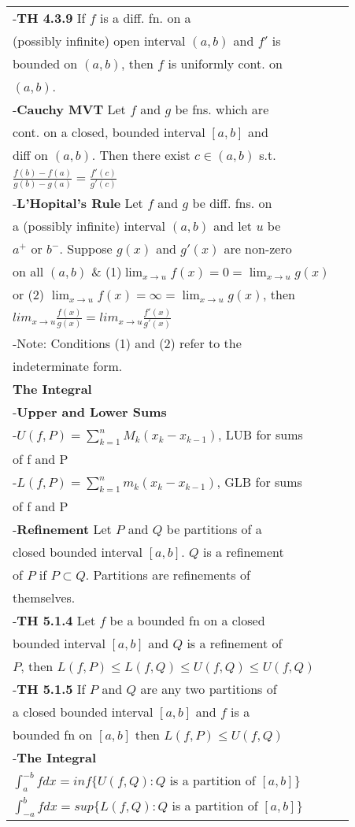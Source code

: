 \documentclass[10 pt,landscape]{article}
\begin{document}
\begin{multicols}{4}
\begin{tabular}{@{}ll@{}}
-\textbf{TH 4.3.9} If $f$ is a diff. fn. on a\\ (possibly infinite) open interval $(a,b)$ and $f'$ is \\ bounded on $(a,b)$, then $f$ is uniformly  cont. on\\ $(a,b)$.\\
-\textbf{Cauchy MVT} Let $f$ and $g$ be fns. which are \\cont. on a closed, bounded interval $[a,b]$ and\\ diff on $(a,b)$. Then there exist $c \in (a,b)$ s.t. \\ $\frac{f(b)-f(a)}{g(b)-g(a)}=\frac{f'(c)}{g'(c)}$\\
-\textbf{L'Hopital's Rule} Let $f$ and $g$ be diff. fns. on \\ a (possibly infinite) interval $(a,b)$ 
and let $u$ be \\
$a^{+}$ or $b^{-}$. Suppose $g(x)$ and $g'(x)$ are 
non-zero\\ on all $(a,b)$ \& (1)$ \lim_{x \to 
	u}f(x)=0=\lim_{x \to u}g(x)$ \\ or (2) $ \lim_{x \to u}f(x)=\infty=\lim_{x \to u}g(x)$, then\\ $lim_{x \to u}\frac{f(x)}{g(x)}=lim_{x \to u}\frac{f'(x)}{g'(x)}$\\
-Note: Conditions (1) and (2) refer to the\\ indeterminate form.
\\
\textbf{The Integral}\\
-\textbf{Upper and Lower Sums}\\
-$U(f,P)=\sum_{k=1}^{n}M_k(x_k-x_{k-1})$, LUB for sums\\of f and P\\
-$L(f,P)=\sum_{k=1}^{n}m_k(x_k-x_{k-1})$, GLB for sums\\of f and P\\
-\textbf{Refinement} Let $P$ and $Q$ be partitions of a \\closed bounded interval $[a,b]$. $Q$ is a refinement\\ of $P$ if $P \subset Q$. Partitions are refinements of\\ themselves.\\
-\textbf{TH 5.1.4} Let $f$ be a bounded fn on a closed\\ bounded interval $[a,b]$ and $Q$ is a refinement of \\$P$, then $L(f,P)\leq L(f,Q)\leq U(f,Q) \leq U(f,Q)$\\
-\textbf{TH 5.1.5} If $P$ and $Q$ are any two partitions of \\a closed bounded interval $[a,b]$ and $f$ is a \\bounded fn on $[a,b]$ then $L(f,P)\leq U(f,Q)$\\
-\textbf{The Integral}\\
$\int_{a}^{-b}f dx=inf\{U(f,Q): Q$ is a partition of $[a,b]\}$\\
$\int_{-a}^{b}f dx=sup\{L(f,Q): Q$ is a partition of $[a,b]\}$\\
\end{tabular} 



\end{multicols}
\end{document}
